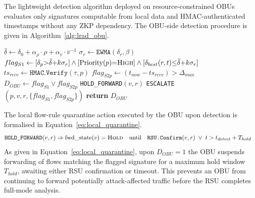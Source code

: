 \documentclass[12pt, a4paper]{report}
\begin{document}
The lightweight detection algorithm deployed on
resource-constrained \ac{OBU}s evaluates only signatures
computable from local data and \ac{HMAC}-authenticated
timestamps without any \ac{ZKP} dependency.
The \ac{OBU}-side detection procedure is given in
Algorithm~\ref{alg:lrad_obu}.


\begin{algorithm}[H]
\caption{\ac{OBU} Lightweight Rule-Based Detection
(\texttt{LRAD-OBU})}
\begin{algorithmic}[1]
\small
{}
  \State $\bar{\delta} \gets \delta_0
         +\alpha_\rho\cdot\rho
         +\alpha_v\cdot\bar{v}^{-1}$
         \hfill{}
  \State $\sigma_r \gets \texttt{EWMA}(\delta_r,\beta)$
         \hfill{}
  \State $flag_{S1} \gets
         [\delta_p{>}\bar{\delta}{+}k\sigma_r]
         \land[\text{Priority}(p){=}\textsc{High}]
         \land[\delta_{best}(r,t){\leq}
         \bar{\delta}{+}k\sigma_r]$
         \hfill{}
  \State $ts_{recv} \gets \texttt{HMAC.Verify}(\tau,p)$
         \hfill{}
  \State $flag_{S2p} \gets
         (t_{now}-ts_{recv})>\Delta_{max}$
         \hfill{}
  \State $D_{OBU} \gets flag_{S1}\lor flag_{S2p}$
         \hfill{}
    \State \texttt{HOLD\_FORWARD}$(v,r)$
           \hfill{}
    \State \texttt{ESCALATE}$(p,v,r,
           \{flag_{S1},flag_{S2p}\})$
           \hfill{}
  \EndIf
  \State \textbf{return} $D_{OBU}$
\EndProcedure
\end{algorithmic}
\label{alg:lrad_obu}
\end{algorithm}

The local flow-rule quarantine action executed by the
\ac{OBU} upon detection is formalised in
Equation~\eqref{eq:local_quarantine}.
\begin{equation}
\texttt{HOLD\_FORWARD}(v,r) \Rightarrow
\text{fwd\_state}(v) = \textsc{Hold}
\quad\text{until}\quad
\texttt{RSU.Confirm}(v,r)\;\lor\;
t > t_{detect} + T_{hold}
\label{eq:local_quarantine}
\end{equation}
As given in Equation~\eqref{eq:local_quarantine},
upon $D_{OBU}{=}1$ the \ac{OBU} suspends forwarding
of flows matching the flagged signature for a maximum
hold window $T_{hold}$, awaiting either \ac{RSU}
confirmation or timeout. This prevents an \ac{OBU}
from continuing to forward potentially attack-affected
traffic before the \ac{RSU} completes full-mode
analysis.
\end{document}
